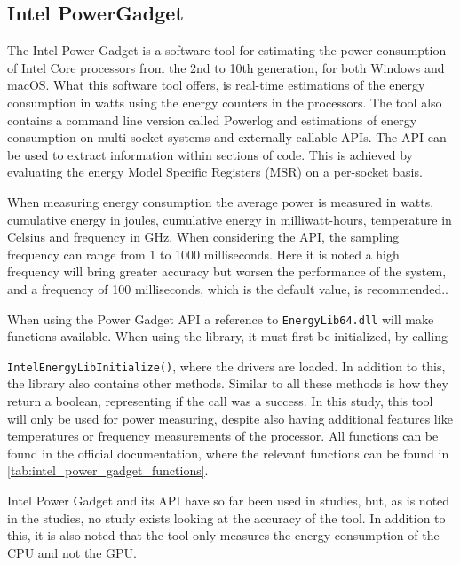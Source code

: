 \subsection{Intel PowerGadget}

The Intel Power Gadget\cite[]{powergadget} is a software tool for estimating the power consumption of Intel Core processors from the 2nd to 10th generation, for both Windows and macOS. What this software tool offers, is real-time estimations of the energy consumption in watts using the energy counters in the processors. 
The tool also contains a command line version called Powerlog and estimations of energy consumption on multi-socket systems and externally callable APIs. The API can be used to extract information within sections of code. This is achieved by evaluating the energy Model Specific Registers (MSR) on a per-socket basis.

When measuring energy consumption the average power is measured in watts, cumulative energy in joules, cumulative energy in milliwatt-hours, temperature in Celsius and frequency in GHz. When considering the API, the sampling frequency can range from 1 to 1000 milliseconds. Here it is noted a high frequency will bring greater accuracy but worsen the performance of the system, and a frequency of 100 milliseconds, which is the default value, is recommended.\cite[]{powergadget_api}.

When using the Power Gadget API a reference to \texttt{EnergyLib64.dll} will make functions available. When using the library, it must first be initialized, by calling 

\texttt{IntelEnergyLibInitialize()}, where the drivers are loaded. In addition to this, the library also contains other methods. Similar to all these methods is how they return a boolean, representing if the call was a success. In this study, this tool will only be used for power measuring, despite also having additional features like temperatures or frequency measurements of the processor. All functions can be found in the official documentation\cite[]{powergadget_api}, where the relevant functions can be found in \cref{tab:intel_power_gadget_functions}.

Intel Power Gadget and its API have so far been used in studies\cite[]{Bruce2015ReducingEC, Ozturk2019, Unlu2021}, but, as is noted in the studies, no study exists looking at the accuracy of the tool. In addition to this, it is also noted that the tool only measures the energy consumption of the CPU and not the GPU.

